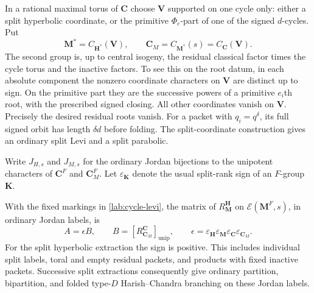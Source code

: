 In a rational maximal torus of $\mathbf C$ choose $\mathbf V$
supported on one cycle only: either a split hyperbolic coordinate,
or the primitive $\Phi_e$-part of one of the signed $d$-cycles.
Put
\begin{equation}\label{lab:cycle-levi}
 \mathbf M^*=C_{\mathbf H^*}(\mathbf V),\qquad
 \mathbf C_M=C_{\mathbf M^*}(s)=C_{\mathbf C}(\mathbf V).
\end{equation}
The second group is, up to central isogeny, the residual classical
factor times the cycle torus and the inactive factors.  To see this
on the root datum,
in each absolute component the nonzero coordinate characters on
$\mathbf V$ are distinct up to sign.  On the primitive part they
are the successive powers of a primitive $e_i$th root, with the
prescribed signed closing.  All other coordinates vanish on
$\mathbf V$.  Precisely the desired residual roots vanish.
For a packet with $q_i=q^\delta$, its full signed orbit has length
$\delta d$ before folding.  The split-coordinate construction
gives an ordinary split Levi and a split parabolic.

Write $J_{H,s}$ and $J_{M,s}$ for the ordinary Jordan bijections
to the unipotent characters of $\mathbf C^F$ and
$\mathbf C_M^F$.  Let $\varepsilon_{\mathbf K}$ denote the usual
split-rank sign of an $F$-group $\mathbf K$.

\begin{proposition}\label{prop:single-cycle}
With the fixed markings in \eqref{lab:cycle-levi}, the matrix of
$R^{\mathbf H}_{\mathbf M}$ on
$\mathcal E(\mathbf M^F,s)$, in ordinary Jordan labels, is
\begin{equation}\label{lab:single-cycle-matrix}
 A=\epsilon B,\qquad
 B=\left[R^{\mathbf C}_{\mathbf C_M}\right]_{\mathrm{unip}},
 \qquad
 \epsilon=
 \varepsilon_{\mathbf H}\varepsilon_{\mathbf M}
 \varepsilon_{\mathbf C}\varepsilon_{\mathbf C_M}.
\end{equation}
For the split hyperbolic extraction the sign is positive.
This includes individual split labels, toral and empty residual
packets, and products with fixed inactive packets.  Successive
split extractions consequently give ordinary partition,
bipartition, and folded type-$D$ Harish--Chandra branching on
these Jordan labels.
\end{proposition}

